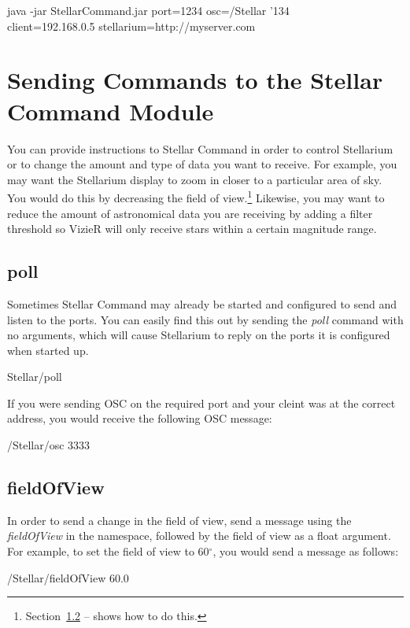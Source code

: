  \begin{syntax}
	\medskip
	java -jar StellarCommand.jar port=1234 osc=/Stellar  {\char'134}\\client=192.168.0.5 stellarium=http://myserver.com\\
	\medskip
\end{syntax}
\bigskip

\section{Sending Commands to the Stellar Command Module}
You can provide instructions to Stellar Command in order to control Stellarium or to change the amount and type of data you want to receive. For example, you may want the Stellarium display to zoom in closer to a particular area of sky. You would do this by decreasing the field of view.\footnote{Section~\ref{subsec:fieldofview} --
	\emph{} shows how to do this.} Likewise, you may want to reduce the amount of astronomical data you are receiving by adding a filter threshold so VizieR will only receive stars within a certain magnitude range. 

\subsection{poll}
Sometimes Stellar Command may already be started and configured to send and listen to the ports. You can easily find this out by sending the \textit{poll} command with no arguments, which will cause Stellarium to reply on the ports it is configured when started up.

 \begin{syntax}
	\medskip
	Stellar/poll
	\medskip
\end{syntax}

If you were sending OSC on the required port and your cleint was at the correct address, you would receive the following OSC message:
\begin{syntax}
	/Stellar/osc 3333  \\
\end{syntax}
\bigskip


\subsection{fieldOfView}\label{subsec:fieldofview}

In order to send a change in the field of view, send a message using the \textit{fieldOfView} in the namespace, followed by the field of view as a float argument. For example, to set the field of view to 60$^{\circ}$, you would send a message as follows:
 \begin{syntax}	
 	\medskip
	/Stellar/fieldOfView 60.0
	\medskip
 \end{syntax}
\bigskip

